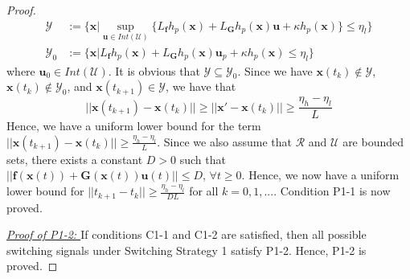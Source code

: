 \documentclass[letterpaper, 10 pt, conference]{ieeeconf}  %
\begin{document}
\begin{proof}
    \begin{align*}
        \mathcal{Y} &:= \{\mathbf{x}|\sup_{\mathbf{u}\in Int(\mathcal{U})}\{L_\mathbf{f}h_p(\mathbf{x}) + L_{\mathbf{G}}h_p(\mathbf{x})\mathbf{u}+\kappa h_p(\mathbf{x})\}\leq \eta_l\}\\
        \mathcal{Y}_0 &:= \{\mathbf{x}| L_\mathbf{f}h_p(\mathbf{x}) + L_{\mathbf{G}}h_p(\mathbf{x})\mathbf{u}_p+\kappa h_p(\mathbf{x}) \leq \eta_l\}
    \end{align*}
    where $\mathbf{u}_0\in Int(\mathcal{U})$. It is obvious that $\mathcal{Y}\subseteq\mathcal{Y}_0$. Since we have $\mathbf{x}(t_k)\notin\mathcal{Y}$, $\mathbf{x}(t_k)\notin\mathcal{Y}_0$, and $\mathbf{x}(t_{k+1})\in\mathcal{Y}$, we have that
    \begin{equation*}
        ||\mathbf{x}(t_{k+1})- \mathbf{x}(t_k)||\geq||\mathbf{x}'- \mathbf{x}(t_k)||\geq {\frac{\eta_h-\eta_l}{L}}
    \end{equation*}
    Hence, we have a uniform lower bound for the term $||\mathbf{x}(t_{k+1})- \mathbf{x}(t_k)||\geq \frac{\eta_h-\eta_l}{L}$. {Since we also assume that $\mathcal{R}$ and $\mathcal{U}$ are bounded sets, there exists a constant $D>0$ such that $||\mathbf{f}(\mathbf{x}(t)) + \mathbf{G}(\mathbf{x}(t))\mathbf{u}(t)|| \leq D$, $\forall t\geq 0$. Hence, we now have a uniform lower bound for $||t_{k+1}-t_k||\geq \frac{\eta_h-\eta_l}{DL}$ for all $k=0,1,...$.} 
    Condition P1-1 is now proved.

    \textit{\underline{Proof of P1-2: }} If conditions C1-1 and C1-2 are satisfied, then all possible switching signals under Switching Strategy 1 satisfy P1-2. Hence, P1-2 is proved.
    
\end{proof}
\end{document}
